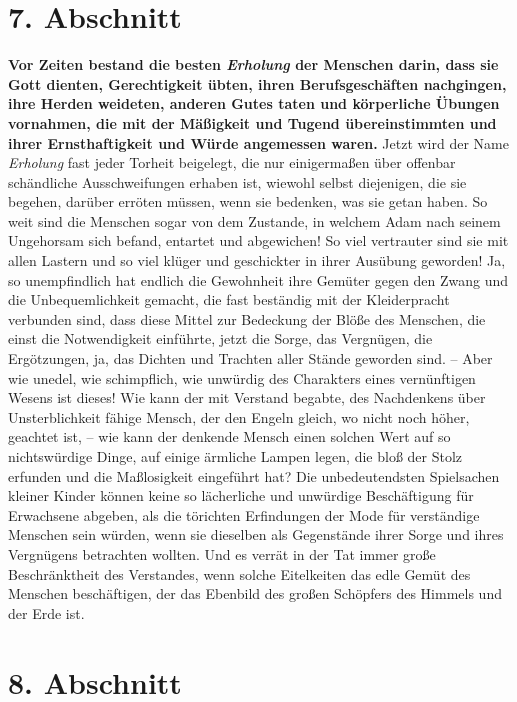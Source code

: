 \section{7. Abschnitt} \label{kap14_ab7}

\label{ref:14_07_wahre_nachfolger_erholung}
 \textbf{Vor Zeiten bestand die
besten \textit{Erholung} der Menschen darin, dass sie Gott
dienten, Gerechtigkeit übten, ihren Berufsgeschäften nachgingen, ihre Herden
weideten, anderen Gutes taten und körperliche Übungen vornahmen, die mit der
Mäßigkeit und Tugend übereinstimmten und ihrer Ernsthaftigkeit und Würde
angemessen waren.} Jetzt wird der Name \textit{Erholung} fast jeder Torheit
beigelegt, die nur einigermaßen über offenbar schändliche Ausschweifungen
erhaben ist, wiewohl selbst diejenigen, die sie begehen, darüber erröten
müssen, wenn sie bedenken, was sie getan haben. So weit sind die Menschen sogar
von dem Zustande, in welchem Adam nach seinem Ungehorsam
sich befand, entartet
und abgewichen! So viel vertrauter sind sie mit allen Lastern und so viel klüger
und geschickter in ihrer Ausübung geworden! Ja, so unempfindlich hat endlich die
Gewohnheit ihre Gemüter gegen den Zwang und die Unbequemlichkeit gemacht, die
fast beständig mit der Kleiderpracht verbunden sind, dass diese Mittel zur
Bedeckung der Blöße des Menschen, die einst die Notwendigkeit einführte, jetzt
die Sorge, das Vergnügen, die Ergötzungen, ja, das Dichten und Trachten aller
Stände geworden sind. -- Aber wie unedel, wie schimpflich, wie unwürdig des
Charakters eines vernünftigen Wesens ist dieses! Wie kann der mit Verstand
begabte, des Nachdenkens über Unsterblichkeit fähige Mensch, der den
Engeln
gleich, wo nicht noch höher, geachtet ist, -- wie kann der denkende Mensch einen
solchen Wert auf so nichtswürdige Dinge, auf einige ärmliche Lampen legen, die
bloß der Stolz erfunden und die Maßlosigkeit
eingeführt hat? Die unbedeutendsten
Spielsachen kleiner Kinder können keine so lächerliche und
unwürdige
Beschäftigung für Erwachsene abgeben, als die törichten Erfindungen der Mode
für verständige Menschen sein würden, wenn sie dieselben als Gegenstände ihrer
Sorge und ihres Vergnügens betrachten wollten. Und es verrät in der Tat immer
große Beschränktheit des Verstandes, wenn solche Eitelkeiten das edle Gemüt des
Menschen beschäftigen, der das Ebenbild des großen Schöpfers des Himmels und der
Erde ist.

\section{8. Abschnitt} \label{kap14_ab8}

